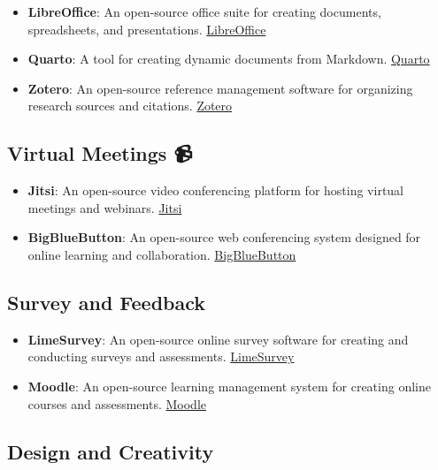 \documentclass[
  letterpaper,
  DIV=11,
  numbers=noendperiod]{scrreprt}
\begin{document}
\begin{itemize}
\item
  \textbf{LibreOffice}: An open-source office suite for creating
  documents, spreadsheets, and presentations.
  \href{https://www.libreoffice.org/}{LibreOffice}
\item
  \textbf{Quarto}: A tool for creating dynamic documents from Markdown.
  \href{https://quarto.org/}{Quarto}
\item
  \textbf{Zotero}: An open-source reference management software for
  organizing research sources and citations.
  \href{https://www.zotero.org/}{Zotero}
\end{itemize}

\subsection{Virtual Meetings 📹}\label{virtual-meetings-1}

\begin{itemize}
\item
  \textbf{Jitsi}: An open-source video conferencing platform for hosting
  virtual meetings and webinars. \href{https://jitsi.org/}{Jitsi}
\item
  \textbf{BigBlueButton}: An open-source web conferencing system
  designed for online learning and collaboration.
  \href{https://bigbluebutton.org/}{BigBlueButton}
\end{itemize}

\subsection{Survey and Feedback 📝}\label{survey-and-feedback-1}

\begin{itemize}
\item
  \textbf{LimeSurvey}: An open-source online survey software for
  creating and conducting surveys and assessments.
  \href{https://www.limesurvey.org/}{LimeSurvey}
\item
  \textbf{Moodle}: An open-source learning management system for
  creating online courses and assessments.
  \href{https://moodle.org/}{Moodle}
\end{itemize}

\subsection{Design and Creativity 🎨}\label{design-and-creativity-1}
\end{document}
